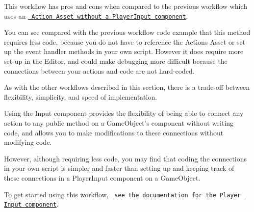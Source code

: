 \begin{DoxyCode}{0}
\DoxyCodeLine{}
\DoxyCodeLine{}
\DoxyCodeLine{\{}
\DoxyCodeLine{}
\DoxyCodeLine{\ \ \ \ \{}
\DoxyCodeLine{\ \ \ \ \}}
\DoxyCodeLine{}
\DoxyCodeLine{\ \ \ \ \{}
\DoxyCodeLine{\ \ \ \ \}}
\DoxyCodeLine{}
\DoxyCodeLine{\ \ \ \ \{}
\DoxyCodeLine{\ \ \ \ \}}
\DoxyCodeLine{}
\DoxyCodeLine{\}}

\end{DoxyCode}


This workflow has pros and cons when compared to the previous workflow which uses an \href{Workflow-ActionsAsset.html}{\texttt{ Action Asset without a Player\+Input component}}.

You can see compared with the previous workflow code example that this method requires less code, because you do not have to reference the Actions Asset or set up the event handler methods in your own script. However it does require more set-\/up in the Editor, and could make debugging more difficult because the connections between your actions and code are not hard-\/coded.

As with the other workflows described in this section, there is a trade-\/off between flexibility, simplicity, and speed of implementation.

Using the  Input component provides the flexibility of being able to connect any action to any public method on a Game\+Object’s component without writing code, and allows you to make modifications to these connections without modifying code.

However, although requiring less code, you may find that coding the connections in your own script is simpler and faster than setting up and keeping track of these connections in a Player\+Input component on a Game\+Object.

To get started using this workflow, \href{PlayerInput.html}{\texttt{ see the documentation for the Player Input component}}. 